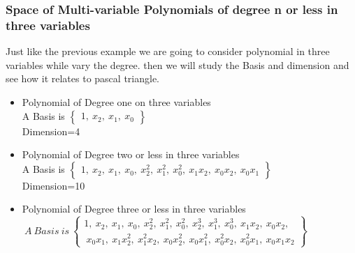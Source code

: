 \documentclass{beamer}
\begin{document}
\begin{frame}
\frametitle{Space of Multi-variable Polynomials of degree n or less in three variables}
\begin{block}{}
Just like the previous example we are going to consider polynomial in three variables while vary the degree. then we will study the Basis and dimension and see how it relates to pascal triangle.

\begin{itemize}
\item Polynomial of Degree one on three variables \\
A Basis is $\begin{Bmatrix}1,~ x_2,~ x_1,~ x_0
\end{Bmatrix}$\\
Dimension=4\\
\item Polynomial of Degree two or less in three variables \\
A Basis is $\begin{Bmatrix}1,~ x_2,~ x_1,~ x_0,~ x_2^2,~ x_1^2,~ x_0^2,~ x_1x_2,~ x_0x_2,~ x_0x_1
\end{Bmatrix}$\\
Dimension=10\\
\item Polynomial of Degree three or less in three variables \\
\newcommand\fontsizex{\fontsize{10pt}{7pt}\selectfont}
{\fontsizex
$~A~Basis~is~\begin{Bmatrix}1,~ x_2,~ x_1,~ x_0,~ x_2^2,~ x_1^2,~ x_0^2,~ x_2^3,~ x_1^3,~ x_0^3,~ x_1x_2,~ x_0x_2,\\~ x_0x_1,~ x_1x_2^2,~ x_1^2x_2,~ x_0x_2^2,~ x_0x_1^2,~ x_0^2x_2,~ x_0^2x_1,~ x_0x_1x_2
\end{Bmatrix}$}\\
\\
\end{itemize}
\end{block}
\end{frame}
\end{document}
